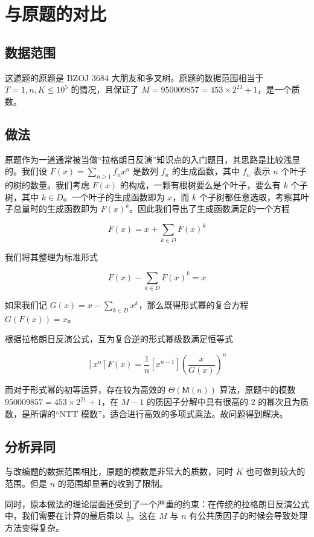 \documentclass[12pt]{ctexart}
\newcommand{\Mul}{\ensuremath{\mathsf M}}
\theoremstyle{theorem}
\theoremstyle{theorem}
\begin{document}
\newpage

\section{与原题的对比}

\subsection{数据范围}

这道题的原题是 BZOJ 3684 大朋友和多叉树。原题的数据范围相当于 $T = 1, n, K \le 10^5$ 的情况，且保证了 $M=950009857 = 453\times2^{21}+1$，是一个质数。

\subsection{做法}

原题作为一道通常被当做“拉格朗日反演”知识点的入门题目，其思路是比较浅显的。我们设 $F(x) = \sum_{n\ge 1} f_n x^n$ 是数列 $f_n$ 的生成函数，其中 $f_n$ 表示 $n$ 个叶子的树的数量。我们考虑 $F(x)$ 的构成，一颗有根树要么是个叶子，要么有 $k$ 个子树，其中 $k\in D$。一个叶子的生成函数即为 $x$，而 $k$ 个子树都任意选取，考察其叶子总量时的生成函数即为 $F(x)^k$。因此我们导出了生成函数满足的一个方程

$$
F(x)=x+\sum_{k\in D} F(x)^k
$$

我们将其整理为标准形式

$$
F(x) - \sum_{k\in D} F(x)^k=x
$$

如果我们记 $G(x) = x - \sum_{k\in D}x^k$，那么既得形式幂的复合方程 $G(F(x))=x$。

根据拉格朗日反演公式，互为复合逆的形式幂级数满足恒等式

$$
[x^n] F(x) = \frac 1n[x^{n-1}] \left(\frac{x}{G(x)}\right)^n
$$

而对于形式幂的初等运算，存在较为高效的 $\Theta(\Mul(n))$ 算法，原题中的模数 $950009857 = 453\times2^{21}+1$，在 $M-1$ 的质因子分解中具有很高的 $2$ 的幂次且为质数，是所谓的“NTT 模数”，适合进行高效的多项式乘法。故问题得到解决。

\subsection{分析异同}

与改编题的数据范围相比，原题的模数是非常大的质数，同时 $K$ 也可做到较大的范围。但是 $n$ 的范围却显著的收到了限制。

同时，原本做法的理论层面还受到了一个严重的约束：在传统的拉格朗日反演公式中，我们需要在计算的最后乘以 $\frac 1n$。这在 $M$ 与 $n$ 有公共质因子的时候会导致处理方法变得复杂。
\end{document}
